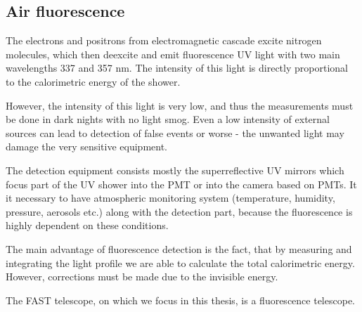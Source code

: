\subsection{Air fluorescence}
The electrons and positrons from electromagnetic cascade excite nitrogen molecules, which then deexcite and emit fluorescence UV light with two main wavelengths 337 and 357 nm. The intensity of this light is directly proportional to the calorimetric energy of the shower.
\par
However, the intensity of this light is very low, and thus the measurements must be done in dark nights with no light smog. Even a low intensity of external sources can lead to detection of false events or worse - the unwanted light may damage the very sensitive equipment. 
\par
The detection equipment consists mostly the superreflective UV mirrors which focus part of the UV shower into the PMT or into the camera based on PMTs. It it necessary to have atmospheric monitoring system (temperature, humidity, pressure, aerosols etc.) along with the detection part, because the fluorescence is highly dependent on these conditions.  
\par
The main advantage of fluorescence detection is the fact, that by measuring and integrating the light profile we are able to calculate the total calorimetric energy. However, corrections must be made due to the invisible energy.

\par
The FAST telescope, on which we focus in this thesis, is a fluorescence telescope.
